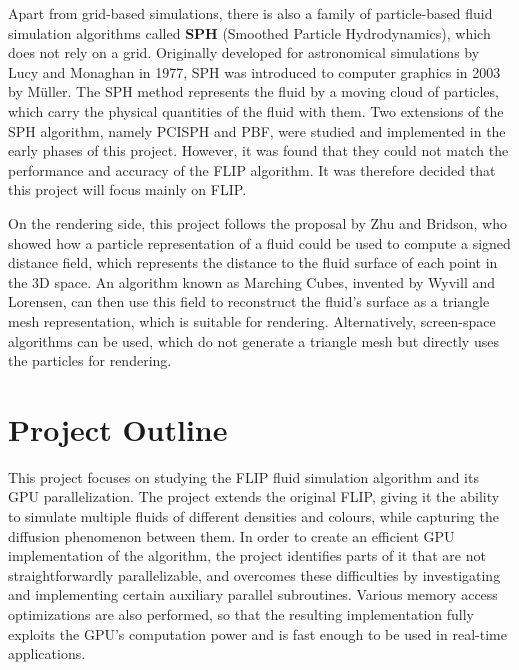 Apart from grid-based simulations, there is also a family of particle-based fluid simulation algorithms called \textbf{SPH} (Smoothed Particle Hydrodynamics), which does not rely on a grid. Originally developed for astronomical simulations by Lucy\cite{lucy1977numerical} and Monaghan\cite{monaghan1992smoothed} in 1977, SPH was introduced to computer graphics in 2003 by Müller\cite{muller2003particle}. The SPH method represents the fluid by a moving cloud of particles, which carry the physical quantities of the fluid with them. Two extensions of the SPH algorithm, namely PCISPH\cite{solenthaler2009predictive} and PBF\cite{macklin2013position}, were studied and implemented in the early phases of this project. However, it was found that they could not match the performance and accuracy of the FLIP algorithm. It was therefore decided that this project will focus mainly on FLIP.


On the rendering side, this project follows the proposal by Zhu and Bridson\cite{zhu2005animating}, who showed how a particle representation of a fluid could be used to compute a signed distance field, which represents the distance to the fluid surface of each point in the 3D space. An algorithm known as Marching Cubes, invented by Wyvill\cite{wyvill1986soft} and Lorensen\cite{lorensen1987marching}, can then use this field to reconstruct the fluid's surface as a triangle mesh representation, which is suitable for rendering. Alternatively, screen-space algorithms\cite{van2009screen} can be used, which do not generate a triangle mesh but directly uses the particles for rendering.



\section{Project Outline}


This project focuses on studying the FLIP fluid simulation algorithm and its GPU parallelization. The project extends the original FLIP, giving it the ability to simulate multiple fluids of different densities and colours, while capturing the diffusion phenomenon between them. In order to create an efficient GPU implementation of the algorithm, the project identifies parts of it that are not straightforwardly parallelizable, and overcomes these difficulties by investigating and implementing certain auxiliary parallel subroutines. Various memory access optimizations are also performed, so that the resulting implementation fully exploits the GPU's computation power and is fast enough to be used in real-time applications.


